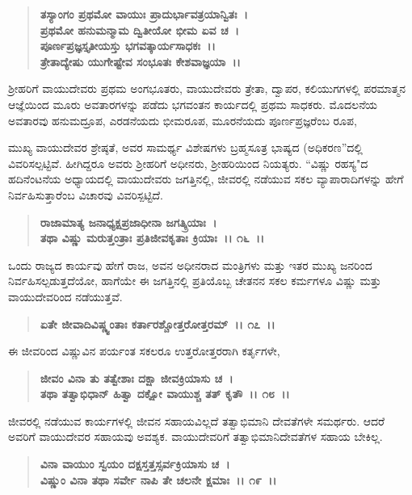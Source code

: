 \begin{verse}
\textbf{ತಸ್ಯಾಂಗಂ ಪ್ರಥಮೋ ವಾಯುಃ ಪ್ರಾದುರ್ಭಾವತ್ರಯಾನ್ವಿತಃ~।}\\\textbf{ಪ್ರಥಮೋ ಹನುಮನ್ಮಾಮ ದ್ವಿತೀಯೋ ಭೀಮ ಏವ ಚ~। }\\\textbf{ಪೂರ್ಣಪ್ರಜ್ಞಸ್ತೃತೀಯಸ್ತು ಭಗವತ್ಕಾರ್ಯಸಾಧಕಃ~।।} \\\textbf{ತ್ರೇತಾದ್ಯೇಷು ಯುಗೇಷ್ಟೇವ ಸಂಭೂತಃ ಕೇಶವಾಜ್ಞಯಾ~।।}
\end{verse}

ಶ‍್ರೀಹರಿಗೆ ವಾಯುದೇವರು ಪ್ರಥಮ ಅಂಗಭೂತರು, ವಾಯುದೇವರು ತ್ರೇತಾ, ದ್ವಾಪರ, ಕಲಿಯುಗಗಳಲ್ಲಿ ಪರಮಾತ್ಮನ ಆಜ್ಞೆಯಿಂದ ಮೂರು ಅವತಾರಗಳನ್ನು ಪಡೆದು ಭಗವಂತನ ಕಾರ್ಯದಲ್ಲಿ ಪ್ರಥಮ ಸಾಧಕರು. ಮೊದಲನೆಯ ಅವತಾರವು ಹನುಮದ್ರೂಪ, ಎರಡನೆಯದು ಭೀಮರೂಪ, ಮೂರನೆಯದು ಪೂರ್ಣಪ್ರಜ್ಞರೆಂಬ ರೂಪ,

ಮುಖ್ಯ ವಾಯುದೇವರ ಶ್ರೇಷ್ಠತೆ, ಅವರ ಸಾಮರ್ಥ್ಯ ವಿಶೇಷಗಳು ಬ್ರಹ್ಮಸೂತ್ರ ಭಾಷ್ಯದ (ಅಧಿಕರಣ”ದಲ್ಲಿ ವಿವರಿಸಲ್ಪಟ್ಟಿವೆ. ಹೀಗಿದ್ದರೂ ಅವರು ಶ‍್ರೀಹರಿಗೆ ಅಧೀನರು, ಶ‍್ರೀಹರಿಯಿಂದ ನಿಯತ್ಯರು. “ವಿಷ್ಣು ರಹಸ್ಯ"ದ ಹದಿನೆಂಟನೆಯ ಅಧ್ಯಾಯದಲ್ಲಿ ವಾಯುದೇವರು ಜಗತ್ತಿನಲ್ಲಿ, ಜೀವರಲ್ಲಿ ನಡೆಯುವ ಸಕಲ ವ್ಯಾಪಾರಾದಿಗಳನ್ನು ಹೇಗೆ ನಿರ್ವಹಿಸುತ್ತಾರೆಂಬ ವಿಚಾರವು ವಿವರಿಸ್ಪಟ್ಟಿದೆ.

\begin{verse}
\textbf{ರಾಜಾಮಾತ್ಯ ಜನಾಧ್ಯಕ್ಷಪ್ರಜಾಧೀನಾ ಜಗತ್ಕ್ರಿಯಾಃ~।}\\\textbf{ತಥಾ ವಿಷ್ಣು ಮರುತ್ತಂತ್ರಾಃ ಪ್ರತಿಜೀವಕೃತಾಃ ಕ್ರಿಯಾಃ~।। ೧೬~।।}
\end{verse}

ಒಂದು ರಾಜ್ಯದ ಕಾರ್ಯವು ಹೇಗೆ ರಾಜ, ಅವನ ಅಧೀನರಾದ ಮಂತ್ರಿಗಳು ಮತ್ತು ಇತರ ಮುಖ್ಯ ಜನರಿಂದ ನಿರ್ವಹಿಸಲ್ಪಡುತ್ತದೆಯೋ, ಹಾಗೆಯೇ ಈ ಜಗತ್ತಿನಲ್ಲಿ ಪ್ರತಿಯೊಬ್ಬ ಚೇತನನ ಸಕಲ ಕರ್ಮಗಳೂ ವಿಷ್ಣು ಮತ್ತು ವಾಯುದೇವರಿಂದ ನಡೆಯುತ್ತವೆ.

\begin{verse}
\textbf{ಏತೇ ಜೀವಾದಿವಿಷ್ಣ್ವಂತಾಃ ಕರ್ತಾರಶ್ಚೋತ್ತರೋತ್ತರಮ್~।। ೧೭~।।}
\end{verse}

ಈ ಜೀವರಿಂದ ವಿಷ್ಣುವಿನ ಪರ್ಯಂತ ಸಕಲರೂ ಉತ್ತರೋತ್ತರರಾಗಿ ಕರ್ತೃಗಳೇ,

\begin{verse}
\textbf{ಜೀವಂ ವಿನಾ ತು ತತ್ವೇಶಾಃ ದಕ್ಷಾ ಜೀವಕ್ರಿಯಾಸು ಚ~।}\\\textbf{ತಥಾ ತತ್ವಾಭಿಧಾನ್ ಹಿತ್ವಾ ದಕ್ಷೋ ವಾಯುಶ್ಚ ತತ್ ಕೃತೌ~।। ೧೮~।।}
\end{verse}

ಜೀವರಲ್ಲಿ ನಡೆಯುವ ಕಾರ್ಯಗಳಲ್ಲಿ ಜೀವನ ಸಹಾಯವಿಲ್ಲದೆ ತತ್ವಾಭಿಮಾನಿ ದೇವತೆಗಳೇ ಸಮರ್ಥರು. ಆದರೆ ಅವರಿಗೆ ವಾಯುದೇವರ ಸಹಾಯವು ಅವಶ್ಯಕ. ವಾಯುದೇವರಿಗೆ ತತ್ವಾಭಿಮಾನಿದೇವತೆಗಳ ಸಹಾಯ ಬೇಕಿಲ್ಲ.

\begin{verse}
\textbf{ವಿನಾ ವಾಯುಂ ಸ್ವಯಂ ದಕ್ಷಸ್ತತ್ತಸ್ಸರ್ವಕ್ರಿಯಾಸು ಚ~।}\\\textbf{ವಿಷ್ಣುಂ ವಿನಾ ತಥಾ ಸರ್ವೇ ನಾಪಿ ತೇ ಚಲನೇ ಕ್ಷಮಾಃ~।। ೧೯~।।}
\end{verse}

